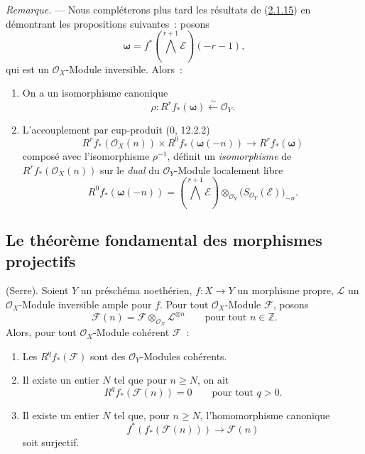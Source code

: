 \begin{env}[2.1.16]
\label{III.2.1.16-fr}
\emph{Remarque.} --- Nous compléterons plus tard les résultats de
(\hyperref[III.2.1.15-fr]{2.1.15}) en démontrant les propositions
suivantes~: posons
\[
\boldsymbol\omega=f^*\left(\bigwedge^{r+1}\mathcal E\right)(-r-1),
\]
qui est un $\mathcal O_X$-Module inversible. Alors~:
\begin{enumerate}
\item[{\rm(i)}] On a un isomorphisme canonique
\begin{equation}
\label{III.2.1.16.1-fr}
\tag{2.1.16.1}
\rho:R^rf_*(\boldsymbol\omega)\xleftarrow{\sim}\mathcal O_Y.
\end{equation}
\item[{\rm(ii)}] L'accouplement par cup-produit (0, 12.2.2)
\begin{equation}
\label{III.2.1.16.2-fr}
\tag{2.1.16.2}
R^rf_*(\mathcal O_X(n))\times R^0f_*(\boldsymbol\omega(-n))
\longrightarrow R^rf_*(\boldsymbol\omega)
\end{equation}
composé avec l'isomorphisme $\rho^{-1}$, définit un \emph{isomorphisme}
de $R^rf_*(\mathcal O_X(n))$ sur le \emph{dual} du $\mathcal O_Y$-Module
localement libre
\[
R^0f_*(\boldsymbol\omega(-n))
=\left(\bigwedge^{r+1}\mathcal E\right)
\otimes_{\mathcal O_Y}\bigl(S_{\mathcal O_Y}(\mathcal E)\bigr)_{-n}.
\]
\end{enumerate}
\end{env}
\subsection{Le théorème fondamental des morphismes projectifs}
\label{subsection:III.2.2-fr}

\begin{theorem}[2.2.1]
\label{III.2.2.1-fr}
(Serre). Soient $Y$ un préschéma noethérien, $f:X\to Y$ un morphisme
propre, $\mathcal L$ un $\mathcal O_X$-Module inversible ample pour $f$.
Pour tout $\mathcal O_X$-Module $\mathcal F$, posons
\[
\mathcal F(n)=\mathcal F\otimes_{\mathcal O_X}\mathcal L^{\otimes n}
\qquad\text{pour tout }n\in\mathbb Z.
\]
Alors, pour tout $\mathcal O_X$-Module cohérent $\mathcal F$~:
\begin{enumerate}
\item[{\rm(i)}] Les $R^qf_*(\mathcal F)$ sont des
$\mathcal O_Y$-Modules cohérents.
\item[{\rm(ii)}] Il existe un entier $N$ tel que pour $n\geq N$, on ait
\[
R^qf_*(\mathcal F(n))=0\qquad\text{pour tout }q>0.
\]
\item[{\rm(iii)}] Il existe un entier $N$ tel que, pour $n\geq N$,
l'homomorphisme canonique
\[
f^*(f_*(\mathcal F(n)))\longrightarrow\mathcal F(n)
\]
soit surjectif.
\end{enumerate}
\end{theorem}

